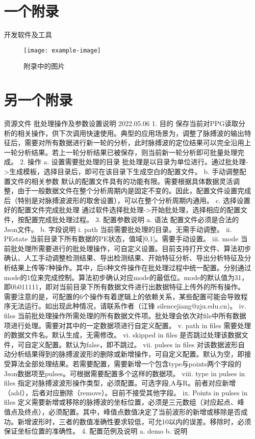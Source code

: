 \cleardoublepage
{

    \appendixsecmajornumbering

    \section{一个附录}
    开发软件及工具

    \begin{figure}[htb]
        \centering
        \texttt{[image: example-image]}
        \caption{附录中的图片}
        \label{fig:test-appendix}
    \end{figure}

    \section{另一个附录}
    资源文件
    批处理操作及参数设置说明
2022.05.06
1. 目的
	保存当前对PPG读取分析的相关操作，供下次调用快速使用。典型的应用场景为，调整了脉搏波的输出特征后，需要对所有数据进行新一轮的分析，此时脉搏波的定位结果可以完全沿用上一轮分析结果。若上一轮分析结果已被保存，则当前新一轮分析即可批量处理完成。
2. 操作
	a. 设置需要批处理的目录
		批处理是以目录为单位进行。通过批处理->生成模板，选择目录后，即可在该目录下生成空白的配置文件。
	b. 手动调整配置文件的相关参数
		默认的配置文件具有的功能有限。需要根据具体数据灵活调整，由于一般数据文件在整个分析周期内是固定不变的。因此，配置文件设置完成后（特别是对脉搏波波形的取舍设置），可以在整个分析周期内通用。
	c. 选择设置好的配置文件完成批处理
		通过软件选择批处理->开始批处理，选择相应的配置文件，按配置完成批处理过程。
3. 配置参数说明
	 a. 语法
		配置文件必须是合法的Json文件。
	b. 字段说明
		i. path 
			当前需要批处理的目录。无需手动调整。
		ii. PEstate
			当前目录下所有数据的PE状态，值域[0,1]。需要手动设置。
		iii. mode
			当前批处理所需要进行的批处理操作，可自定义设置。目前支持打开文件、算法初步确认、人工手动调整检测结果、导出检测结果、开始特征分析、导出分析特征及分析结果上传等7种操作。其中，后6种文件操作在批处理过程中统一配置。分别通过mode的1位来完成控制。算法初步确认对应mode的最低位。mode的默认值为31，即0b011111，即对当前目录下所有数据文件进行出数据特征上传外的所有操作。
			需要注意的是，可配置的6个操作有着逻辑上的依赖关系，某些配置可能会导致程序无法运行。如出现此种情况，请联系作者（江锋 silencejiang@zju.edu.cn)。
		iv. files
			当前批处理操作所需处理的所有数据文件项。批处理会依次对file中所有数据项进行处理。需要对其中的一定数据项进行自定义配置。
		v. path in files
			需要处理的数据文件名。默认生成，无需修改。
		vi. skipped in files
			是否跳过处理该数据文件，可自定义配置。默认为false，即不跳过。
		vii. pulses in files
			对该数据波形自动分析结果得到的脉搏波波形的删除或新增操作，可自定义配置。默认为空，即接受算法全部处理结果。若需要配置，需要新增一个包含type与points两个字段的Json数据项至pulses。可根据需要配置多个这样的数据项。
		viii. type in pulses in files
			指定对脉搏波波形操作类型，必须配置。可选字段,A与R。前者对应新增（add），后者对应删除（remove）。目前不接受其他字段。
		ix. Points in pulses in files
			定义需要新增或移除的脉搏波的坐标位置，必须是三元数组（对应起点、峰值点及终点），必须配置。其中，峰值点数值决定了当前波形的新增或移除是否成功。新增波形时，三者的数值准确性要求较低，可允10以内的误差。移除时，必须保证坐标位置的准确性。
4. 配置范例及说明
	a. demo	
	b. 说明

}